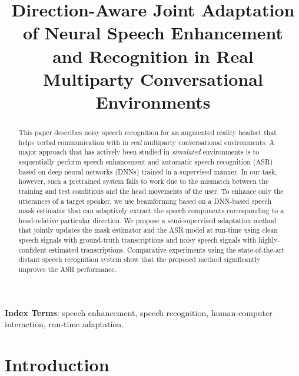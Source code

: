\documentclass[a4paper]{article}
\title{
Direction-Aware Joint Adaptation of Neural Speech Enhancement and Recognition 
in Real Multiparty Conversational Environments
}
\begin{document}
\setlength{\intextsep}{5pt} \setlength{\textfloatsep}{5pt} \setlength{\abovecaptionskip}{5pt}
\setlength{\belowcaptionskip}{5pt}

\setlength{\abovedisplayskip}{3pt}
\setlength{\belowdisplayskip}{3pt}
\allowdisplaybreaks[4]

\maketitle
\begin{abstract}
\vspace{-1mm}
This paper describes noisy speech recognition for an augmented reality headset
 that helps verbal communication with in \textit{real} multiparty conversational environments.
A major approach that has actively been studied in \textit{simulated} environments
 is to sequentially perform speech enhancement and automatic speech recognition (ASR)
 based on deep neural networks (DNNs) trained in a supervised manner.
In our task, however,
 such a pretrained system fails to work
 due to the mismatch between the training and test conditions
 and the head movements of the user.
To enhance only the utterances of a target speaker,
 we use beamforming based on a DNN-based speech mask estimator
 that can adaptively extract the speech components 
 corresponding to a head-relative particular direction.
We propose a semi-supervised adaptation method
 that jointly updates the mask estimator and the ASR model at run-time
 using clean speech signals with ground-truth transcriptions
 and noisy speech signals with highly-confident estimated transcriptions.
Comparative experiments using the state-of-the-art distant speech recognition system
 show that the proposed method significantly 
 improves the ASR performance.
\end{abstract}
\noindent\textbf{Index Terms}: 
speech enhancement, speech recognition, human-computer interaction, 
run-time adaptation.

\section{Introduction} \label{sec-intro}		
\end{document}
